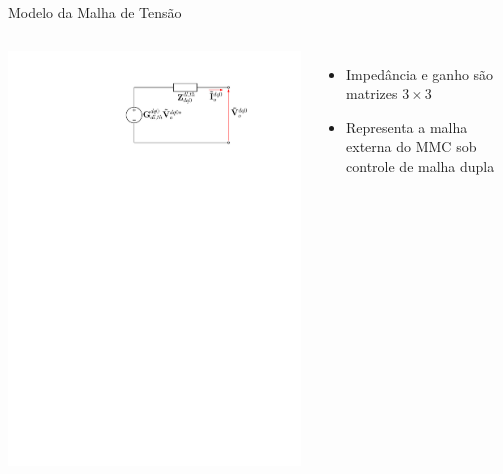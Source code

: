 \begin{frame}{Modelo da Malha de Tensão}




\begin{columns}

\centering

\vspace*{0.5cm}

\includegraphics[width=0.9\linewidth]{./figuras/figuras_srf/Thevenin_SRF_VI}



\begin{itemize}
	\item Impedância e ganho são matrizes $3 \times 3$\\[10pt]
	
	\item Representa a malha externa do MMC sob controle de malha dupla		
\end{itemize}


\end{columns}
\end{frame}
